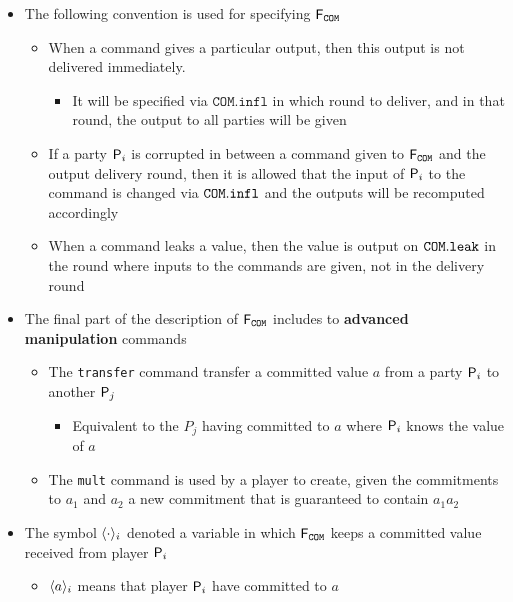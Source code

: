 \begin{itemize}
	\item The following convention is used for specifying $\FCOM$
  \begin{itemize}
		\item When a command gives a particular output, then this output is not delivered immediately.
    \begin{itemize}
			\item It will be specified via $\mathtt{COM}.\mathtt{infl}$ in which round to deliver, and in that round, the output to all parties will be given
    \end{itemize}
		\item If a party $\P_i$ is corrupted in between a command given to $\FCOM$ and the output delivery round, then it is allowed that the input of $\P_i$ to the command is changed via $\COM.\infl$ and the outputs will be recomputed accordingly
		\item When a command leaks a value, then the value is output on $\COM.\leak$ in the round where inputs to the commands are given, not in the delivery round
  \end{itemize}

	\item The final part of the description of $\FCOM$ includes to \textbf{advanced manipulation} commands
  \begin{itemize}
		\item The \texttt{transfer} command transfer a committed value $a$ from a party $\P_i$ to another $\P_j$
    \begin{itemize}
			 \item Equivalent to the $P_j$ having committed to $a$ where $\P_i$ knows the value of $a$
    \end{itemize}
		\item The \texttt{mult} command is used by a player to create, given the commitments to $a_1$ and $a_2$ a new commitment that is guaranteed to contain $a_1a_2$
  \end{itemize}

	\item The symbol $\commit{\cdot}{i}$ denoted a variable in which $\FCOM$ keeps a committed value received from player $\P_i$
  \begin{itemize}
		\item $\commit{a}{i}$ means that player $\P_i$ have committed to $a$
  \end{itemize}


\end{itemize}
